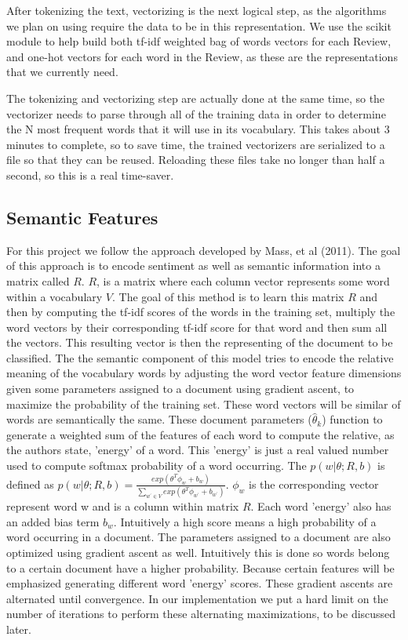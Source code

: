 \documentclass[11pt,letterpaper]{article}
\begin{document}
After tokenizing the text, vectorizing is the next logical step, as the algorithms we plan on using require the data to be in this representation. We use the scikit module to help build both tf-idf weighted bag of words vectors for each Review, and one-hot vectors for each word in the Review, as these are the representations that we currently need.

The tokenizing and vectorizing step are actually done at the same time, so the vectorizer needs to parse through all of the training data in order to determine the N most frequent words that it will use in its vocabulary. This takes about 3 minutes to complete, so to save time, the trained vectorizers are serialized to a file so that they can be reused. Reloading these files take no longer than half a second, so this is a real time-saver.


\subsection{Semantic Features}

For this project we follow the approach developed by Mass, et al (2011). The goal of this approach is to encode sentiment as well as semantic information into a matrix called $R$. $R$, is a matrix where each column vector represents some word within a vocabulary $V$. The goal of this method is to learn this matrix $R$ and then by computing the tf-idf scores of the words in the training set, multiply the word vectors by their corresponding tf-idf score for that word and then sum all the vectors. This resulting vector is then the representing of the document to be classified. The the semantic component of this model tries to encode the relative meaning of the vocabulary words by adjusting the word vector feature dimensions given some parameters assigned to a document using gradient ascent, to maximize the probability of the training set. These word vectors will be similar of words are semantically the same. These document parameters ($\hat{\theta}_{k}$) function to generate a weighted sum of the features of each word to compute the relative, as the authors state, 'energy' of a word. This 'energy' is just a real valued number used to compute softmax probability of a word occurring. The $p(w|\theta; R,b)$ is defined as $p(w|\theta;R,b) = \frac{exp(\theta^{T}\phi_{w}+b_{w})}{\sum_{w^{'}\in V} exp(\theta^{T}\phi_{w^{'}}+b_{w^{'}})}$. $\phi_{w}$ is the corresponding vector represent word w and is a column within matrix $R$. Each word 'energy' also has an added bias term $b_{w}$. Intuitively a high score means a high probability of a word occurring in a document. The parameters assigned to a document are also optimized using gradient ascent as well. Intuitively this is done so words belong to a certain document have a higher probability. Because certain features will be emphasized generating different word 'energy' scores. These gradient ascents are alternated until convergence. In our implementation we put a hard limit on the number of iterations to perform these alternating maximizations, to be discussed later.
\end{document}

